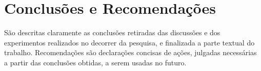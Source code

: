 \chapter{Conclusões e Recomendações}
\label{cap:05}

São   descritas   claramente   as   conclusões retiradas   das discussões  e  dos  experimentos  realizados  no  decorrer  da  pesquisa,  e  finalizada  a parte  textual  do  trabalho.  Recomendações  são  declarações  concisas  de  ações, julgadas necessárias a partir das conclusões obtidas, a serem usadas no futuro.